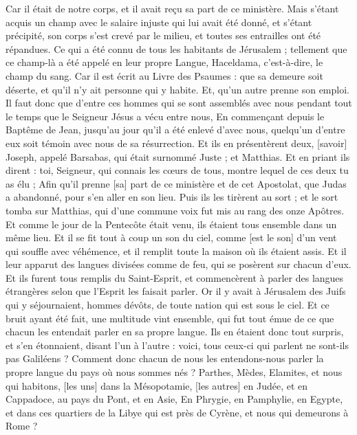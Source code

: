 \begin{multicols}{2}
Car il était de notre corps, et il avait reçu sa part de ce ministère.
Mais s'étant acquis un champ avec le salaire injuste qui lui avait été donné, et s'étant précipité, son corps s'est crevé par le milieu, et toutes ses entrailles ont été répandues.
Ce qui a été connu de tous les habitants de Jérusalem ; tellement que ce champ-là a été appelé en leur propre Langue, Haceldama, c'est-à-dire, le champ du sang.
Car il est écrit au Livre des Psaumes : que sa demeure soit déserte, et qu'il n'y ait personne qui y habite. Et, qu'un autre prenne son emploi.
Il faut donc que d'entre ces hommes qui se sont assemblés avec nous pendant tout le temps que le Seigneur Jésus a vécu entre nous,
En commençant depuis le Baptême de Jean, jusqu'au jour qu'il a été enlevé d'avec nous, quelqu'un d'entre eux soit témoin avec nous de sa résurrection.
Et ils en présentèrent deux, [savoir] Joseph, appelé Barsabas, qui était surnommé Juste ; et Matthias.
Et en priant ils dirent : toi, Seigneur, qui connais les cœurs de tous, montre lequel de ces deux tu as élu ;
Afin qu'il prenne [sa] part de ce ministère et de cet Apostolat, que Judas a abandonné, pour s'en aller en son lieu.
Puis ils les tirèrent au sort ; et le sort tomba sur Matthias, qui d'une commune voix fut mis au rang des onze Apôtres.
\VerseOne{}Et comme le jour de la Pentecôte était venu, ils étaient tous ensemble dans un même lieu.
Et il se fit tout à coup un son du ciel, comme [est le son] d'un vent qui souffle avec véhémence, et il remplit toute la maison où ils étaient assis.
Et il leur apparut des langues divisées comme de feu, qui se posèrent sur chacun d'eux.
Et ils furent tous remplis du Saint-Esprit, et commencèrent à parler des langues étrangères selon que l'Esprit les faisait parler.
Or il y avait à Jérusalem des Juifs qui y séjournaient, hommes dévôts, de toute nation qui est sous le ciel.
Et ce bruit ayant été fait, une multitude vint ensemble, qui fut tout émue de ce que chacun les entendait parler en sa propre langue.
Ils en étaient donc tout surpris, et s'en étonnaient, disant l'un à l'autre : voici, tous ceux-ci qui parlent ne sont-ils pas Galiléens ?
Comment donc chacun de nous les entendons-nous parler la propre langue du pays où nous sommes nés ?
Parthes, Mèdes, Elamites, et nous qui habitons, [les uns] dans la Mésopotamie, [les autres] en Judée, et en Cappadoce, au pays du Pont, et en Asie,
En Phrygie, en Pamphylie, en Egypte, et dans ces quartiers de la Libye qui est près de Cyrène, et nous qui demeurons à Rome ?

\end{multicols}
